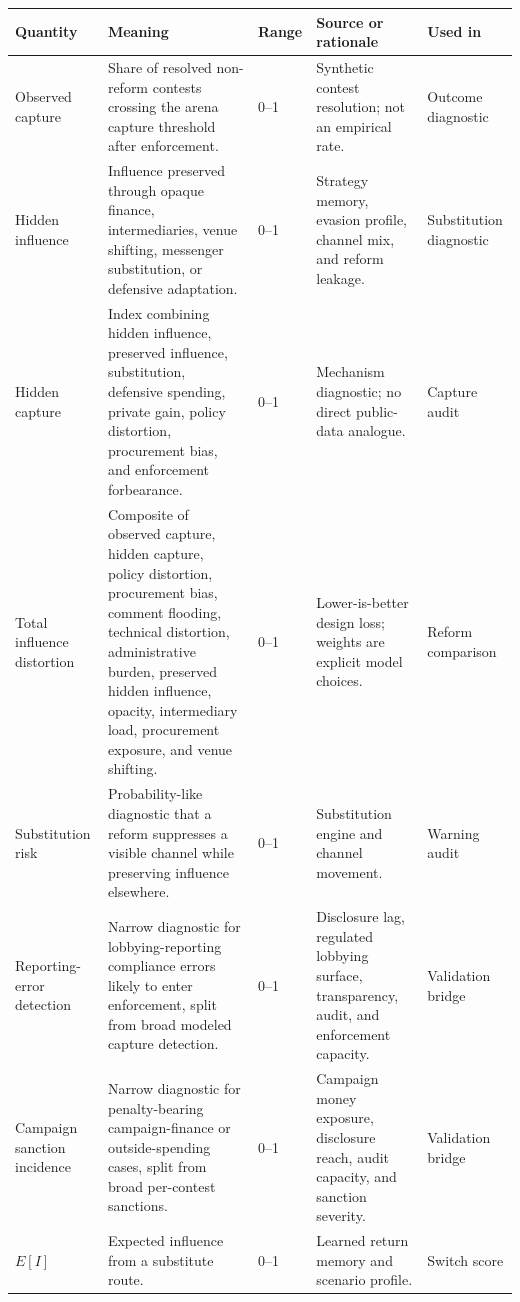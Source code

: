 \begin{table}[tbp]
\centering
\scriptsize
\setlength{\tabcolsep}{3pt}
\begin{tabular}{p{}p{}p{}p{}p{}}
\toprule
Quantity & Meaning & Range & Source or rationale & Used in \\
\midrule
Observed capture & Share of resolved non-reform contests crossing the arena capture threshold after enforcement. & 0--1 & Synthetic contest resolution; not an empirical rate. & Outcome diagnostic \\
Hidden influence & Influence preserved through opaque finance, intermediaries, venue shifting, messenger substitution, or defensive adaptation. & 0--1 & Strategy memory, evasion profile, channel mix, and reform leakage. & Substitution diagnostic \\
Hidden capture & Index combining hidden influence, preserved influence, substitution, defensive spending, private gain, policy distortion, procurement bias, and enforcement forbearance. & 0--1 & Mechanism diagnostic; no direct public-data analogue. & Capture audit \\
Total influence distortion & Composite of observed capture, hidden capture, policy distortion, procurement bias, comment flooding, technical distortion, administrative burden, preserved hidden influence, opacity, intermediary load, procurement exposure, and venue shifting. & 0--1 & Lower-is-better design loss; weights are explicit model choices. & Reform comparison \\
Substitution risk & Probability-like diagnostic that a reform suppresses a visible channel while preserving influence elsewhere. & 0--1 & Substitution engine and channel movement. & Warning audit \\
Reporting-error detection & Narrow diagnostic for lobbying-reporting compliance errors likely to enter enforcement, split from broad modeled capture detection. & 0--1 & Disclosure lag, regulated lobbying surface, transparency, audit, and enforcement capacity. & Validation bridge \\
Campaign sanction incidence & Narrow diagnostic for penalty-bearing campaign-finance or outside-spending cases, split from broad per-contest sanctions. & 0--1 & Campaign money exposure, disclosure reach, audit capacity, and sanction severity. & Validation bridge \\
\(E[I]\) & Expected influence from a substitute route. & 0--1 & Learned return memory and scenario profile. & Switch score \\

\end{tabular}
\end{table}
